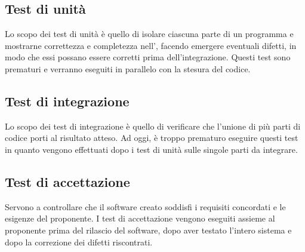 \subsection{Test di unità}
Lo scopo dei test di unità è quello di isolare ciascuna parte di un programma e mostrarne correttezza e completezza nell', facendo emergere eventuali difetti, in modo che essi possano essere corretti prima dell'integrazione. Questi test sono prematuri e verranno eseguiti in parallelo con la stesura del codice.
\subsection{Test di integrazione}
Lo scopo dei test di integrazione è quello di verificare che l'unione di più parti di codice porti al risultato atteso. Ad oggi, è troppo prematuro eseguire questi test in quanto vengono effettuati dopo i test di unità sulle singole parti da integrare.
\subsection{Test di accettazione}
Servono a controllare che il software creato soddisfi i requisiti concordati e le esigenze del proponente. I test di accettazione vengono eseguiti assieme al proponente prima del rilascio del software, dopo aver testato l'intero sistema e dopo la correzione dei difetti riscontrati.